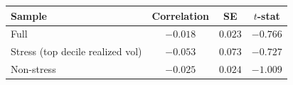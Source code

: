 \begin{tabular}{lccc}
\hline
Sample & Correlation & SE & $t$-stat \\
\hline
Full & $-0.018$ & $0.023$ & $-0.766$ \\
Stress (top decile realized vol) & $-0.053$ & $0.073$ & $-0.727$ \\
Non-stress & $-0.025$ & $0.024$ & $-1.009$ \\
\hline
\end{tabular}
